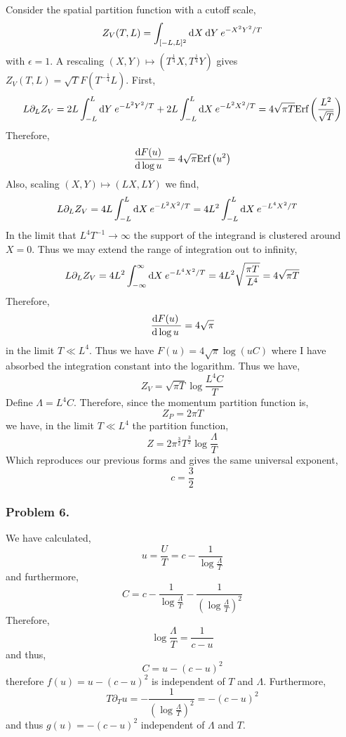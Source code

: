 \documentclass[12pt]{article}
\begin{document}
\newcommand{\Erf}[1]{\text{Erf}\left( #1 \right)}

Consider the spatial partition function with a cutoff scale,
\[ Z_V(T, L) = \int_{[-L, L]^2} \mathrm{d}X \: \mathrm{d}Y \: e^{- X^2 Y^2 / T} \]
with $\epsilon = 1$. A rescaling $(X, Y) \mapsto (T^{\frac{1}{4}} X, T^{\tfrac{1}{4}} Y)$ gives $Z_V(T, L) = \sqrt{T} F(T^{-\frac{1}{4}} L)$. First,
\begin{align*}
L \partial_L Z_V = 2 L \int_{-L}^L \d{Y} e^{-L^2 Y^2 / T} + 2L \int_{-L}^L \d{X} e^{- L^2 X^2 / T} = 4 \sqrt{\pi T} \Erf{\frac{L^2}{\sqrt{T}}}
\end{align*} 
Therefore,
\[ \deriv{F(u)}{\log{u}} = 4 \sqrt{\pi}\Erf{u^2} \]
Also, scaling $(X, Y) \mapsto (LX, LY)$ we find,
\begin{align*}
L \partial_L Z_V & = 4 L \int_{-L}^L \mathrm{d}X \: e^{-L^2 X^2 / T}  = 4 L^2 \int_{-L}^L \mathrm{d}X \: e^{-L^4 X^2 / T}
\end{align*}
In the limit that $L^4 T^{-1} \to \infty$ the support of the integrand is clustered around $X = 0$. Thus we may extend the range of integration out to infinity,
\begin{align*}
L \partial_L Z_V = 4 L^2 \int_{-\infty}^{\infty} \mathrm{d}X \: e^{-L^4 X^2 / T} = 4 L^2 \sqrt{\frac{\pi T}{L^4}} = 4 \sqrt{\pi T} 
\end{align*}
Therefore,
\[ \frac{\mathrm{d}F(u) \:}{\mathrm{d}\log{u} \:} = 4 \sqrt{\pi} \]
in the limit $T \ll L^4$. Thus we have $F(u) = 4 \sqrt{\pi}\log{(u C)}$ where I have absorbed the integration constant into the logarithm. Thus we have,
\[ Z_V = \sqrt{\pi T} \log{\frac{L^4C}{T}} \] 
Define $\Lambda = L^4 C$. 
Therefore, since the momentum partition function is,
\[ Z_P = 2 \pi T \] 
we have, in the limit $T \ll L^4$ the partition function,
\[ Z = 2 \pi^{\frac{3}{2}} T^{\frac{3}{2}} \log{\frac{\Lambda}{T}} \]
Which reproduces our previous forms and gives the same universal exponent,
\[ c = \frac{3}{2} \]

\subsubsection{Problem 6.}

We have calculated,
\[ u = \frac{U}{T} = c - \frac{1}{\log{\frac{\Lambda}{T}}} \]
and furthermore,
\[ C = c - \frac{1}{\log{\frac{\Lambda}{T}}} - \frac{1}{(\log{\frac{\Lambda}{T}})^2} \]
Therefore,
\[ \log{\frac{\Lambda}{T}} = \frac{1}{c - u} \]
and thus,
\[ C =  u - (c - u)^2 \]
therefore $f(u) = u - (c - u)^2$ is independent of $T$ and $\Lambda$. Furthermore,
\[ T \partial_T u = - \frac{1}{(\log{\frac{\Lambda}{T}})^2} = - (c - u)^2 \]
and thus $g(u) = - (c - u)^2$ independent of $\Lambda$ and $T$.  
\end{document}

